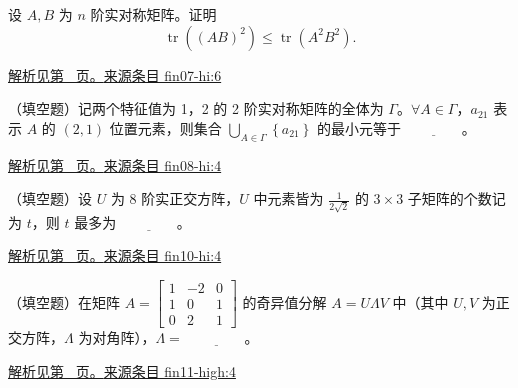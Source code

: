 \documentclass[12pt,fontset=fandol]{ctexart}
\begin{document}
\begin{example}\label{ex:fin07-hi:6}

设 $A,B$ 为 $n$ 阶实对称矩阵。证明
\[
\operatorname{tr}\left(\left(AB\right)^{2}\right)\leq\operatorname{tr}\left(A^{2}B^{2}\right).
\]

\par\hyperref[ans:fin07-hi:6]{解析见第~\pageref{ans:fin07-hi:6} 页。}\quad\href{https://github.com/lzxcr/cmc-mathematics/blob/64916fa1fdbc3e444a652eca204d5669058ee321/src/problems/finals/07/06.md}{来源条目 fin07-hi:6}

\end{example}

\begin{example}\label{ex:fin08-hi:4}

（填空题）记两个特征值为 1，2 的 2 阶实对称矩阵的全体为 $\Gamma$。$\forall A\in\Gamma$，$a_{21}$ 表示 $A$ 的 $(2,1)$ 位置元素，则集合 $\bigcup_{A\in\Gamma}\left\{a_{21}\right\}$ 的最小元等于 $\underline{\qquad\qquad}$。

\par\hyperref[ans:fin08-hi:4]{解析见第~\pageref{ans:fin08-hi:4} 页。}\quad\href{https://github.com/lzxcr/cmc-mathematics/blob/64916fa1fdbc3e444a652eca204d5669058ee321/src/problems/finals/08/04.md}{来源条目 fin08-hi:4}

\end{example}

\begin{example}\label{ex:fin10-hi:4}

（填空题）设 $U$ 为 8 阶实正交方阵，$U$ 中元素皆为 $\frac{1}{2\sqrt{2}}$ 的 $3 \times 3$ 子矩阵的个数记为 $t$，则 $t$ 最多为 $\underline{\qquad\qquad}$。

\par\hyperref[ans:fin10-hi:4]{解析见第~\pageref{ans:fin10-hi:4} 页。}\quad\href{https://github.com/lzxcr/cmc-mathematics/blob/64916fa1fdbc3e444a652eca204d5669058ee321/src/problems/finals/10/04.md}{来源条目 fin10-hi:4}

\end{example}

\begin{example}\label{ex:fin11-high:4}

（填空题）在矩阵 $A = \begin{bmatrix} 1 & -2 & 0 \\ 1 & 0 & 1 \\ 0 & 2 & 1 \end{bmatrix}$ 的奇异值分解 $A = U\Lambda V$ 中（其中 $U,V$ 为正交方阵，$\Lambda$ 为对角阵），$\Lambda = $ $\underline{\qquad\qquad}$。

\par\hyperref[ans:fin11-high:4]{解析见第~\pageref{ans:fin11-high:4} 页。}\quad\href{https://github.com/lzxcr/cmc-mathematics/blob/64916fa1fdbc3e444a652eca204d5669058ee321/src/problems/finals/11/04.md}{来源条目 fin11-high:4}

\end{example}
\end{document}
